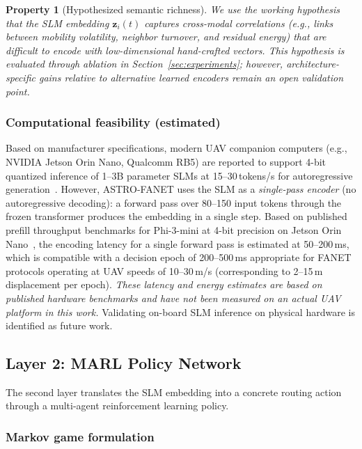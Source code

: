 \documentclass[5p,times]{elsarticle}
\newtheorem{property}{Property}[section]
\begin{document}
\begin{property}[Hypothesized semantic richness]
\label{prop:semantic}
We use the working hypothesis that the SLM embedding $\mathbf{z}_i(t)$ captures cross-modal correlations (e.g., links between mobility volatility, neighbor turnover, and residual energy) that are difficult to encode with low-dimensional hand-crafted vectors. This hypothesis is evaluated through ablation in Section~\ref{sec:experiments}; however, architecture-specific gains relative to alternative learned encoders remain an open validation point.
\end{property}

\subsubsection{Computational feasibility (estimated)}

Based on manufacturer specifications, modern UAV companion computers (e.g., NVIDIA Jetson Orin Nano, Qualcomm RB5) are reported to support 4-bit quantized inference of 1--3B parameter SLMs at 15--30\,tokens/s for autoregressive generation~\cite{abdin2024phi3,lin2024awq}. However, ASTRO-FANET uses the SLM as a \emph{single-pass encoder} (no autoregressive decoding): a forward pass over 80--150 input tokens through the frozen transformer produces the embedding in a single step. Based on published prefill throughput benchmarks for Phi-3-mini at 4-bit precision on Jetson Orin Nano~\cite{xu2024survey_slm}, the encoding latency for a single forward pass is estimated at 50--200\,ms, which is compatible with a decision epoch of 200--500\,ms appropriate for FANET protocols operating at UAV speeds of 10--30\,m/s (corresponding to 2--15\,m displacement per epoch). \emph{These latency and energy estimates are based on published hardware benchmarks and have not been measured on an actual UAV platform in this work.} Validating on-board SLM inference on physical hardware is identified as future work.

\subsection{Layer 2: MARL Policy Network}
\label{subsec:marl_policy}

The second layer translates the SLM embedding into a concrete routing action through a multi-agent reinforcement learning policy.

\subsubsection{Markov game formulation}
\end{document}
